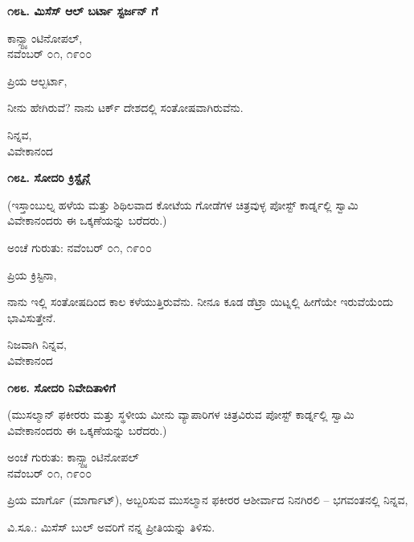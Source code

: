 \begin{center}
\textbf{೧೮೬. ಮಿಸೆಸ್ ಆಲ್ ಬರ್ಟಾ ಸ್ಟರ್ಜನ್ ಗೆ}
\end{center}

\begin{flushright}
ಕಾನ್ಸ್ಟ್ಯಾಂಟಿನೋಪಲ್,\\ನವೆಂಬರ್ ೦೧, ೧೯೦೦
\end{flushright}

ಪ್ರಿಯ ಆಲ್ಬರ್ಟಾ,

ನೀನು ಹೇಗಿರುವೆ? ನಾನು ಟರ್ಕ್ ದೇಶದಲ್ಲಿ ಸಂತೋಷವಾಗಿರುವೆನು.

\begin{flushright}
ನಿನ್ನವ,\\ವಿವೇಕಾನಂದ
\end{flushright}

\begin{center}
\textbf{೧೮೭. ಸೋದರಿ ಕ್ರಿಸ್ಟೈನ್ಗೆ}
\end{center}

(ಇಸ್ತಾಂಬುಲ್ನ ಹಳೆಯ ಮತ್ತು ಶಿಥಿಲವಾದ ಕೋಟೆಯ ಗೋಡೆಗಳ ಚಿತ್ರವುಳ್ಳ ಪೋಸ್ಟ್ ಕಾರ್ಡ್ನಲ್ಲಿ ಸ್ವಾಮಿ ವಿವೇಕಾನಂದರು ಈ ಒಕ್ಕಣೆಯನ್ನು ಬರೆದರು.)

\begin{flushright}
ಅಂಚೆ ಗುರುತು: ನವೆಂಬರ್ ೦೧, ೧೯೦೦
\end{flushright}

ಪ್ರಿಯ ಕ್ರಿಸ್ಟಿನಾ,

ನಾನು ಇಲ್ಲಿ ಸಂತೋಷದಿಂದ ಕಾಲ ಕಳೆಯುತ್ತಿರುವೆನು. ನೀನೂ ಕೂಡ ಡೆಟ್ರಾ ಯಿಟ್ನಲ್ಲಿ ಹೀಗೆಯೇ ಇರುವೆಯೆಂದು ಭಾವಿಸುತ್ತೇನೆ.

\begin{flushright}
ನಿಜವಾಗಿ ನಿನ್ನವ,\\ವಿವೇಕಾನಂದ
\end{flushright}

\begin{center}
\textbf{೧೮೮. ಸೋದರಿ ನಿವೇದಿತಾಳಿಗೆ}
\end{center}

\begin{flushright}
(ಮುಸಲ್ಮಾನ್ ಫಕೀರರು ಮತ್ತು ಸ್ಥಳೀಯ ಮೀನು ವ್ಯಾಪಾರಿಗಳ ಚಿತ್ರವಿರುವ ಪೋಸ್ಟ್ ಕಾರ್ಡ್ನಲ್ಲಿ ಸ್ವಾಮಿ ವಿವೇಕಾನಂದರು ಈ ಒಕ್ಕಣೆಯನ್ನು ಬರೆದರು.)
\end{flushright}

\begin{flushright}
ಅಂಚೆ ಗುರುತು: ಕಾನ್ಸ್ಟ್ಯಾಂಟಿನೋಪಲ್\\ನವೆಂಬರ್ ೦೧, ೧೯೦೦
\end{flushright}

ಪ್ರಿಯ ಮಾರ್ಗೊ (ಮಾರ್ಗಾಟ್), ಅಬ್ಬರಿಸುವ ಮುಸಲ್ಮಾನ ಫಕೀರರ ಆಶೀರ್ವಾದ ನಿನಗಿರಲಿ – ಭಗವಂತನಲ್ಲಿ ನಿನ್ನವ,

ವಿ.ಸೂ.: ಮಿಸೆಸ್ ಬುಲ್ ಅವರಿಗೆ ನನ್ನ ಪ್ರೀತಿಯನ್ನು ತಿಳಿಸು.

